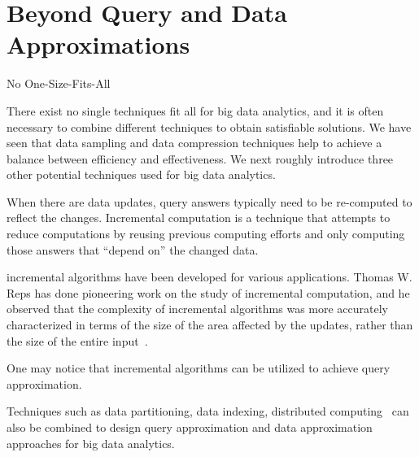 \section{Beyond Query and Data Approximations}
\label{sec-beyond}
No One-Size-Fits-All

There exist no single techniques fit all for big data analytics, and  it is often necessary to combine different techniques to obtain satisfiable solutions.
We have seen that data sampling and data compression techniques help to achieve a balance between efficiency and effectiveness.
We next roughly introduce three other potential techniques used for big data analytics.


When there are data updates, query answers typically need to be re-computed to reflect the changes. Incremental computation is a technique that attempts to reduce computations by reusing previous computing efforts and only computing those answers that ``depend on'' the changed data.


 incremental algorithms have been developed for
various applications.  Thomas W. Reps has done pioneering work on the study of incremental computation, and he observed that
the complexity of incremental algorithms was more accurately characterized
in terms of the size of the area affected by the updates, rather than the size
of the entire input~\cite{Reps96}.

One may notice that incremental algorithms can be utilized to achieve query approximation.



Techniques such as data partitioning, data indexing, distributed computing~\cite{MaLHLH16} can also be combined to design query approximation and data approximation approaches for big data analytics.



